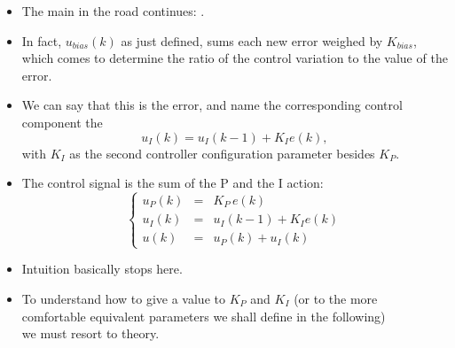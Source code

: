 \begin{frame}
\myPause
 \begin{itemize}[<+-| alert@+>]
 \item The main in the road continues: . 
 \item In fact, $u_{bias}(k)$ as just defined, sums each new error weighed by $K_{bias}$, which comes
       to determine the ratio of the control variation  to the value of the error.
 \item We can say that this is  the error, and name the corresponding control component
       the 
       \begin{displaymath}
        u_I(k) = u_I(k-1)+ K_I e(k),
       \end{displaymath}
        with $K_I$ as the second controller configuration parameter besides $K_P$.
 \end{itemize}
\end{frame}

\begin{frame}
\framesubtitleTC{}
\myPause
 \begin{itemize}[<+-| alert@+>]
 \item The control signal is the sum of the P and the I action:
       \begin{displaymath}
        \left\{\begin{array}{rcl}
         u_P(k) &=& K_P \, e(k) \\
         u_I(k) &=& u_I(k-1)+ K_I e(k) \\
         u(k)   &=& u_P(k)+u_I(k)
        \end{array}\right.
       \end{displaymath}
 \item \vfill Intuition basically stops here.
 \item To understand how to give a value to $K_P$ and $K_I$ (or to the more\\
       comfortable equivalent parameters we shall define in the following)\\
       we must resort to theory.
 \end{itemize}
\end{frame}
